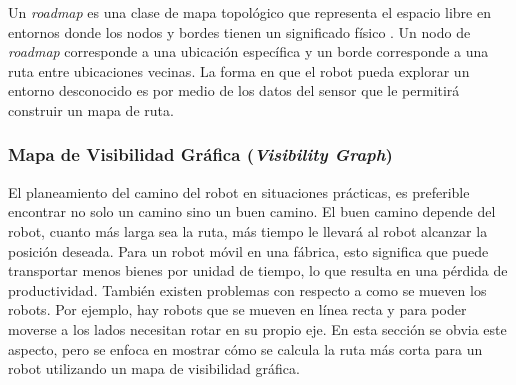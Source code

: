 Un \textit{roadmap} es una clase de mapa topol\'ogico que representa el 
espacio libre en entornos donde los nodos y bordes tienen un significado 
f\'isico \cite{choset2005RoadMap}. Un nodo de \textit{roadmap} corresponde a una 
ubicaci\'on espec\'ifica y un borde corresponde a una ruta entre ubicaciones vecinas. La 
forma en que el robot pueda explorar un entorno desconocido es por medio de los datos del 
sensor que le permitir\'a construir un mapa de ruta.




\subsubsection{Mapa de Visibilidad Gr\'afica (\textit{Visibility Graph})}

El planeamiento del camino del robot en situaciones pr\'acticas, es preferible 
encontrar no solo un camino sino un buen camino. El buen camino depende del 
robot, cuanto m\'as larga sea la ruta, m\'as tiempo le llevar\'a al robot 
alcanzar la posici\'on deseada. Para un robot m\'ovil en una f\'abrica, esto 
significa que puede transportar menos bienes por unidad de tiempo, lo que 
resulta en una p\'erdida de productividad. Tambi\'en existen problemas con 
respecto a como se mueven los robots. Por ejemplo, hay robots que se mueven 
en l\'inea recta y para poder moverse a los lados necesitan rotar en su 
propio eje. En esta secci\'on se obvia este aspecto, pero se enfoca en 
mostrar c\'omo se calcula la ruta m\'as corta para un robot utilizando 
un mapa de visibilidad gr\'afica.

